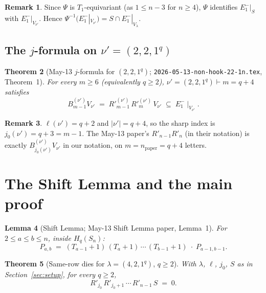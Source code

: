 \documentclass[11pt]{article}
\newtheorem{theorem}{Theorem}
\newtheorem{lemma}[theorem]{Lemma}
\theoremstyle{definition}
\newtheorem{remark}[theorem]{Remark}
\begin{document}
\begin{remark}\label{rem:E1-preservation}
Since $\Psi$ is $T_1$-equivariant (as $1 \le n - 3$ for $n \ge 4$),
$\Psi$ identifies $E_1^-|_S$ with $E_1^-|_{V_{\nu'}}$. Hence
$\Psi^{-1}(E_1^-|_{V_{\nu'}}) = S \cap E_1^-|_{V_\lambda}$.
\end{remark}

\subsection{The $j$-formula on $\nu' = (2, 2, 1^q)$}\label{sec:22}

\begin{theorem}[May-13 $j$-formula for $(2, 2, 1^q)$;
\texttt{2026-05-13-non-hook-22-1n.tex}, Theorem~1]\label{thm:22}
For every $m \ge 6$ (equivalently $q \ge 2$),
$\nu' = (2, 2, 1^q) \vdash m = q + 4$ satisfies
\[
   B^{(\nu')}_{m-1} V_{\nu'}
   \;=\; R'^{(\nu')}_{m-1}\,R'^{(\nu')}_m\,V_{\nu'}
   \;\subseteq\; E_1^-\!\mid_{V_{\nu'}}.
\]
\end{theorem}

\begin{remark}\label{rem:22-index}
$\ell(\nu') = q + 2$ and $|\nu'| = q + 4$, so the sharp index is
$j_0(\nu') = q + 3 = m - 1$. The May-13 paper's $R'_{n-1} R'_n$
(in their notation) is exactly $B^{(\nu')}_{j_0(\nu')} V_{\nu'}$ in
our notation, on $m = n_{\text{paper}} = q + 4$ letters.
\end{remark}

\section{The Shift Lemma and the main proof}\label{sec:main}

\begin{lemma}[Shift Lemma; May-13 Shift Lemma paper,
Lemma~1]\label{lem:shift}
For $2 \le a \le b \le n$, inside $H_q(S_n)$:
\[
   P_{a, b}
   \;=\;
   (T_{a-1}+1)\,(T_a+1)\,\cdots\,(T_{b-1}+1)\;\cdot\; P_{a-1, b-1}.
\]
\end{lemma}

\begin{theorem}[Same-row dies for $\lambda = (4, 2, 1^q)$,
$q \ge 2$]\label{thm:main}
With $\lambda$, $\ell$, $j_0$, $S$ as in Section~\ref{sec:setup}, for
every $q \ge 2$,
\begin{equation}\label{eq:main}
   R'_{j_0}\,R'_{j_0+1}\,\cdots\,R'_{n-1}\,S \;=\; 0.
\end{equation}
\end{theorem}
\end{document}
